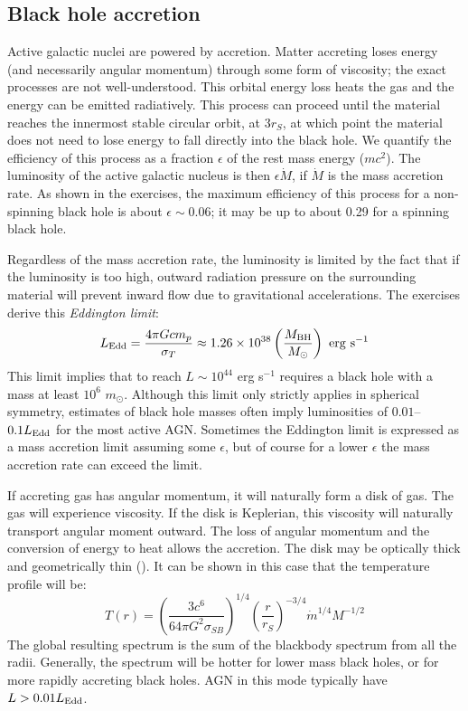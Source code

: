 \subsection{Black hole accretion}

Active galactic nuclei are powered by accretion. Matter accreting
loses energy (and necessarily angular momentum) through some form of
viscosity; the exact processes are not well-understood. This orbital
energy loss heats the gas and the energy can be emitted
radiatively. This process can proceed until the material reaches the
innermost stable circular orbit, at $3r_S$, at which point the
material does not need to lose energy to fall directly into the black
hole. We quantify the efficiency of this process as a fraction
$\epsilon$ of the rest mass energy ($mc^2$). The luminosity of the
active galactic nucleus is then $\epsilon \dot M$, if $\dot M$ is the
mass accretion rate. As shown in the exercises, the maximum efficiency
of this process for a non-spinning black hole is about $\epsilon \sim
0.06$; it may be up to about 0.29 for a spinning black hole.

Regardless of the mass accretion rate, the luminosity is limited by
the fact that if the luminosity is too high, outward radiation
pressure on the surrounding material will prevent inward flow due to
gravitational accelerations. The exercises derive this {\it Eddington
  limit}:
\begin{equation}
\label{eq:eddington}
L_{\rm Edd} = \frac{4\pi G c m_p}{\sigma_T} \approx 1.26 \times
10^{38} \left(\frac{M_{\rm BH}}{M_\odot}\right) \mathrm{~erg~s}^{-1}
\end{equation}
This limit implies that to reach $L\sim 10^{44}$ erg s$^{-1}$ requires
a black hole with a mass at least $10^6$ $m_\odot$. Although this
limit only strictly applies in spherical symmetry, estimates of black
hole masses often imply luminosities of $0.01$--$0.1 L_{\rm Edd}$ for
the most active AGN. Sometimes the Eddington limit is expressed as a
mass accretion limit assuming some $\epsilon$, but of course for a
lower $\epsilon$ the mass accretion rate can exceed the limit.

If accreting gas has angular momentum, it will naturally form a disk
of gas. The gas will experience viscosity. If the disk is Keplerian,
this viscosity will naturally transport angular moment outward. The
loss of angular momentum and the conversion of energy to heat allows
the accretion. The disk may be optically thick and geometrically thin
(\citealt{shakura73a}). It can be shown in this case that the
temperature profile will be:
\begin{equation}
  T(r) = \left(\frac{3 c^6}{64\pi G^2 \sigma_{SB}}\right)^{1/4}
    \left(\frac{r}{r_S}\right)^{-3/4} {\dot m}^{1/4} M^{-1/2}
\end{equation}
The global resulting spectrum is the sum of the blackbody spectrum
from all the radii. Generally, the spectrum will be hotter for lower
mass black holes, or for more rapidly accreting black holes. AGN in
this mode typically have $L>0.01 L_{\rm Edd}$.

